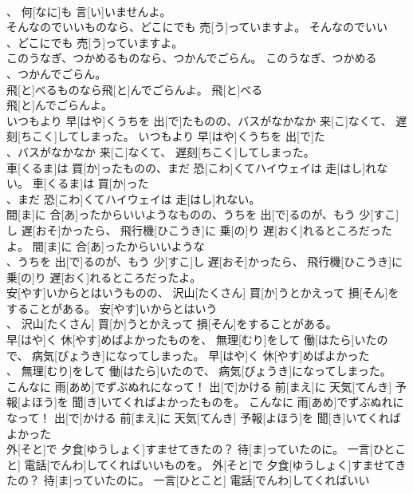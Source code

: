 \documentclass[8pt]{extreport}
\begin{document}
\begin{CJK}{UTF8}{min}
\\	、 何[なに]も 言[い]いませんよ。	
\\	そんなのでいいものなら、どこにでも 売[う]っていますよ。	そんなのでいい
\\	、どこにでも 売[う]っていますよ。	
\\	このうなぎ、つかめるものなら、つかんでごらん。	このうなぎ、つかめる
\\	、つかんでごらん。	
\\	飛[と]べるものなら飛[と]んでごらんよ。	飛[と]べる
\\	飛[と]んでごらんよ。	
\\	いつもより 早[はや]くうちを 出[で]たものの、バスがなかなか 来[こ]なくて、 遅刻[ちこく]してしまった。	いつもより 早[はや]くうちを 出[で]た
\\	、バスがなかなか 来[こ]なくて、 遅刻[ちこく]してしまった。	
\\	車[くるま]は 買[か]ったものの、まだ 恐[こわ]くてハイウェイは 走[はし]れない。	車[くるま]は 買[か]った
\\	、まだ 恐[こわ]くてハイウェイは 走[はし]れない。	
\\	間[ま]に 合[あ]ったからいいようなものの、うちを 出[で]るのが、もう 少[すこ]し 遅[おそ]かったら、 飛行機[ひこうき]に 乗[の]り 遅[おく]れるところだったよ。	間[ま]に 合[あ]ったからいいような
\\	、うちを 出[で]るのが、もう 少[すこ]し 遅[おそ]かったら、 飛行機[ひこうき]に 乗[の]り 遅[おく]れるところだったよ。	
\\	安[やす]いからとはいうものの、 沢山[たくさん] 買[か]うとかえって 損[そん]をすることがある。	安[やす]いからとはいう
\\	、 沢山[たくさん] 買[か]うとかえって 損[そん]をすることがある。	
\\	早[はや]く 休[やす]めばよかったものを、 無理[むり]をして 働[はたら]いたので、 病気[びょうき]になってしまった。	早[はや]く 休[やす]めばよかった
\\	、 無理[むり]をして 働[はたら]いたので、 病気[びょうき]になってしまった。	
\\	こんなに 雨[あめ]でずぶぬれになって！ 出[で]かける 前[まえ]に 天気[てんき] 予報[よほう]を 聞[き]いてくればよかったものを。	こんなに 雨[あめ]でずぶぬれになって！ 出[で]かける 前[まえ]に 天気[てんき] 予報[よほう]を 聞[き]いてくればよかった
\\	外[そと]で 夕食[ゆうしょく]すませてきたの？ 待[ま]っていたのに。 一言[ひとこと] 電話[でんわ]してくればいいものを。	外[そと]で 夕食[ゆうしょく]すませてきたの？ 待[ま]っていたのに。 一言[ひとこと] 電話[でんわ]してくればいい

\end{CJK}
\end{document}
